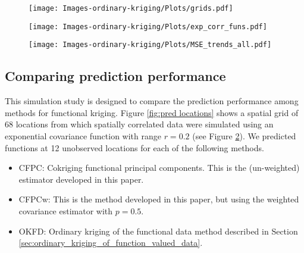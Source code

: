 \begin{figure}[h]
	\begin{center}
		\texttt{[image: Images-ordinary-kriging/Plots/grids.pdf]} 
	\end{center}
	 \label{fig:grid3} 
\end{figure}

\begin{figure}[h]
	\begin{center}
		\texttt{[image: Images-ordinary-kriging/Plots/exp\_corr\_funs.pdf]} 
	\end{center}
	 \label{fig:exp_corr_funs} 
\end{figure}

\begin{figure}[h]
	\begin{center}
		\texttt{[image: Images-ordinary-kriging/Plots/MSE\_trends\_all.pdf]} 
	\end{center}
	 \label{fig:MSE_trends} 
\end{figure}


\subsection{Comparing prediction performance} %
\label{sub:comparing_prediction_performance}
This simulation study is designed to compare the prediction performance among methods for functional kriging. Figure \ref{fig:pred locations} shows a spatial grid of 68 locations from which spatially correlated data were simulated using an exponential covariance function with range $r = 0.2$ (see Figure \ref{fig:exp_corr_funs}). We predicted functions at 12 unobserved locations for each of the following methods.
\begin{itemize}
	\item CFPC: Cokriging functional principal components. This is the (un-weighted) estimator developed in this paper.
	\item CFPCw: This is the method developed in this paper, but using the weighted covariance estimator with $p=0.5$.
	\item OKFD: Ordinary kriging of the functional data method described in Section \ref{sec:ordinary_kriging_of_function_valued_data}.
\end{itemize}

